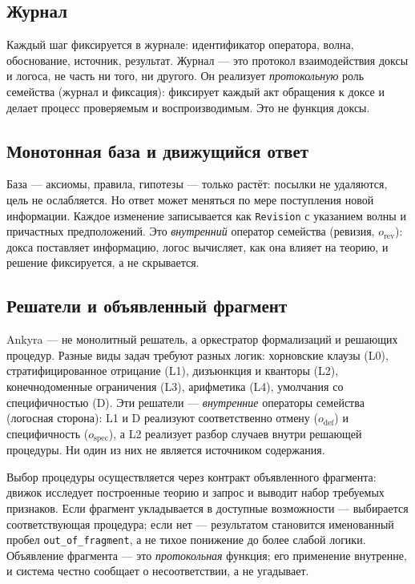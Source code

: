 \documentclass[12pt,a4paper]{article}
\begin{document}
\subsection{Журнал}
\label{sec:journal}

Каждый шаг фиксируется в журнале: идентификатор оператора, волна, обоснование, источник, результат.
Журнал --- это протокол взаимодействия доксы и логоса, не часть ни того, ни другого. Он реализует
\emph{протокольную} роль семейства (журнал и фиксация): фиксирует каждый акт обращения к доксе
и делает процесс проверяемым и воспроизводимым. Это не функция доксы.

\subsection{Монотонная база и движущийся ответ}
\label{sec:revision}

База --- аксиомы, правила, гипотезы --- только растёт: посылки не удаляются, цель не ослабляется.
Но ответ может меняться по мере поступления новой информации. Каждое изменение записывается как
\texttt{Revision} с указанием волны и причастных предположений. Это \emph{внутренний} оператор
семейства (ревизия, $o_{\text{rev}}$): докса поставляет информацию, логос вычисляет, как она
влияет на теорию, и решение фиксируется, а не скрывается.

\subsection{Решатели и объявленный фрагмент}
\label{sec:engines}

Ankyra --- не монолитный решатель, а оркестратор формализаций и решающих процедур. Разные виды
задач требуют разных логик: хорновские клаузы (L0), стратифицированное отрицание (L1), дизъюнкция
и кванторы (L2), конечнодоменные ограничения (L3), арифметика (L4), умолчания со специфичностью (D).
Эти решатели --- \emph{внутренние} операторы семейства (логосная сторона): L1 и D реализуют
соответственно отмену ($o_{\text{def}}$) и специфичность ($o_{\text{spec}}$), а L2 реализует
разбор случаев внутри решающей процедуры. Ни один из них не является источником содержания.

Выбор процедуры осуществляется через контракт объявленного фрагмента: движок исследует построенные
теорию и запрос и выводит набор требуемых признаков. Если фрагмент укладывается в доступные
возможности --- выбирается соответствующая процедура; если нет --- результатом становится
именованный пробел \texttt{out\_of\_fragment}, а не тихое понижение до более слабой логики.
Объявление фрагмента --- это \emph{протокольная} функция; его применение внутренне, и система
честно сообщает о несоответствии, а не угадывает.
\end{document}
